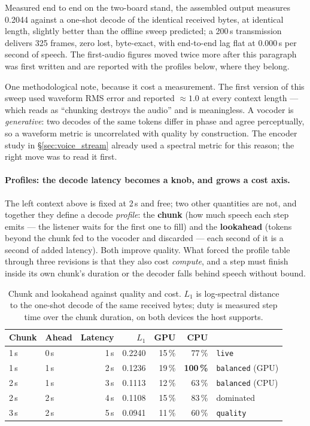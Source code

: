 Measured end to end on the two-board stand, the assembled output
measures 0.2044 against a one-shot decode of the identical received
bytes, at identical length, slightly better than the offline sweep
predicted; a 200\,s transmission delivers 325 frames, zero lost,
byte-exact, with end-to-end lag flat at 0.000\,s per second of
speech.  The first-audio figures moved twice more after this
paragraph was first written and are reported with the profiles below,
where they belong.

One methodological note, because it cost a measurement.  The first
version of this sweep used waveform RMS error and reported $\approx
1.0$ at every context length --- which reads as ``chunking destroys the
audio'' and is meaningless.  A vocoder is \emph{generative}: two
decodes of the same tokens differ in phase and agree perceptually, so a
waveform metric is uncorrelated with quality by construction.  The
encoder study in \S\ref{sec:voice_stream} already used a spectral
metric for this reason; the right move was to read it first.

\paragraph{Profiles: the decode latency becomes a knob, and grows a
cost axis.}
The left context above is fixed at 2\,s and free; two other quantities
are not, and together they define a decode \emph{profile}: the
\textbf{chunk} (how much speech each step emits --- the listener waits
for the first one to fill) and the \textbf{lookahead} (tokens beyond
the chunk fed to the vocoder and discarded --- each second of it is a
second of added latency).  Both improve quality.  What forced the
profile table through three revisions is that they also cost
\emph{compute}, and a step must finish inside its own chunk's duration
or the decoder falls behind speech without bound.

\begin{table}[H]
    \centering
    \caption{Chunk and lookahead against quality and cost.  $L_1$ is
             log-spectral distance to the one-shot decode of the same
             received bytes; duty is measured step time over the chunk
             duration, on both devices the host supports.}
    \label{tab:voice_profiles}
    \small
    \begin{tabular}{@{}llrrrrl@{}}
    \toprule
    \textbf{Chunk} & \textbf{Ahead} & \textbf{Latency} &
    \textbf{$L_1$} & \textbf{GPU} & \textbf{CPU} & \\
    \midrule
    1\,s & 0\,s & 1\,s & 0.2240 & 15\,\% &  77\,\% & \texttt{live} \\
    1\,s & 1\,s & 2\,s & 0.1236 & 19\,\% & \textbf{100\,\%} &
        \texttt{balanced} (GPU) \\
    2\,s & 1\,s & 3\,s & 0.1113 & 12\,\% &  63\,\% &
        \texttt{balanced} (CPU) \\
    2\,s & 2\,s & 4\,s & 0.1108 & 15\,\% &  83\,\% & dominated \\
    3\,s & 2\,s & 5\,s & 0.0941 & 11\,\% &  60\,\% & \texttt{quality} \\
    \bottomrule
    \end{tabular}
\end{table}

